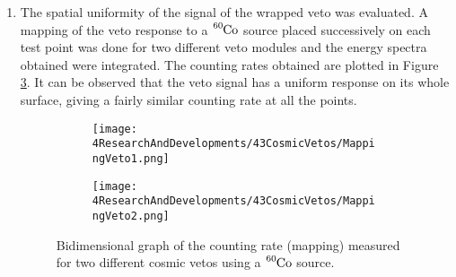 \begin{enumerate}
\item{} The spatial uniformity of the signal of the wrapped veto was evaluated. A mapping of the veto response to a $\ce{^{60}Co}$ source placed successively on each test point was done for two different veto modules and the energy spectra obtained were integrated. The counting rates obtained are plotted in Figure \ref{fig:MappingVetos}. It can be observed that the veto signal has a uniform response on its whole surface, giving a fairly similar counting rate at all the points.
\begin{figure}
\centering
    \begin{subfigure}[b]{0.9\textwidth}
    \centering
    \texttt{[image: 4ResearchAndDevelopments/43CosmicVetos/MappingVeto1.png]}  
    \caption{\label{subfig:MappingVeto1}}
    \end{subfigure}
    \hfill
    \begin{subfigure}[b]{0.9\textwidth}
    \centering
    \texttt{[image: 4ResearchAndDevelopments/43CosmicVetos/MappingVeto2.png]}  
    \caption{\label{subfig:MappingVeto2}}
    \end{subfigure}
 \caption{Bidimensional graph of the counting rate (mapping) measured for two different cosmic vetos using a $\ce{^{60}Co}$ source.}
 \label{fig:MappingVetos}
\end{figure}
\end{enumerate}
